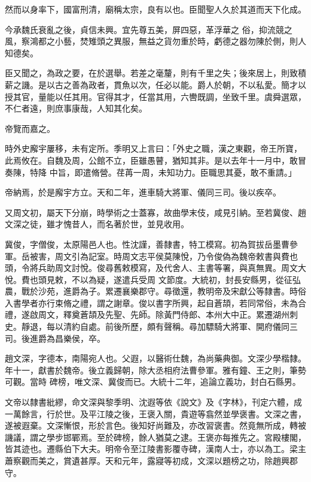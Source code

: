 \begin{pinyinscope}
 然而以身率下，國富刑清，廟稱太宗，良有以也。臣聞聖人久於其道而天下化成。



 今承魏氏衰亂之後，貞信未興。宜先尊五美，屏四惡，革浮華之
 俗，抑流競之風，察鴻都之小藝，焚雉頭之異服，無益之貨勿重於時，虧德之器勿陳於側，則人知德矣。



 臣又聞之，為政之要，在於選舉。若差之毫釐，則有千里之失；後來居上，則致積薪之譏。是以古之善為政者，貫魚以次，任必以能。爵人於朝，不以私愛。簡才以授其官，量能以任其用。官得其才，任當其用，六轡既調，坐致千里。虞舜選眾，不仁者遠，則庶事康哉，人知其化矣。



 帝覽而嘉之。



 時外史廨宇屢移，未有定所。季明又上言曰：「外史之職，漢之東觀，帝王所寶，此焉攸在。自魏及周，公館不立，臣雖愚瞽，猶知其非。是以去年十一月中，敢冒奏陳，特降
 中旨，即遣脩營。荏苒一周，未知功力。臣職思其憂，敢不重請。」



 帝納焉，於是廨宇方立。天和二年，進車騎大將軍、儀同三司。後以疾卒。



 又周文初，屬天下分崩，時學術之士蓋寡，故曲學末伎，咸見引納。至若冀俊、趙文深之徒，雖才愧昔人，而名著於世，並見收用。



 冀俊，字僧俊，太原陽邑人也。性沈謹，善隸書，特工模寫。初為賀拔岳墨曹參軍。岳被害，周文引為記室。時周文志平侯莫陳悅，乃令俊偽為魏帝敕書與費也頭，令將兵助周文討悅。俊尋舊敕模寫，及代舍人、主書等署，與真無異。周文大悅。費也頭見敕，不以為疑，遂遣兵受周
 文節度。大統初，封長安縣男，從征弘農，戰於沙苑，進爵為子。累遷襄樂郡守。尋徵還，教明帝及宋獻公等隸書。時俗入書學者亦行束脩之禮，謂之謝章。俊以書字所興，起自蒼頡，若同常俗，未為合禮，遂啟周文，釋奠蒼頡及先聖、先師。除黃門侍郎、本州大中正。累遷湖州刺史。靜退，每以清約自處。前後所歷，頗有聲稱。尋加驃騎大將軍、開府儀同三司。後進爵為昌樂侯，卒。



 趙文深，字德本，南陽宛人也。父遐，以醫術仕魏，為尚藥典御。文深少學楷隸。年十一，獻書於魏帝。後立義歸朝，除大丞相府法曹參軍。雅有鐘、王之則，筆勢可觀。當時
 碑榜，唯文深、冀俊而已。大統十二年，追論立義功，封白石縣男。



 文帝以隸書紕繆，命文深與黎季明、沈遐等依《說文》及《字林》，刊定六體，成一萬餘言，行於世。及平江陵之後，王褒入關，貴遊等翕然並學褒書。文深之書，遂被遐棄。文深慚恨，形於言色。後知好尚難及，亦改習褒書。然竟無所成，轉被譏議，謂之學步邯鄲焉。至於碑榜，餘人猶莫之逮。王褒亦每推先之。宮殿樓閣，皆其迹也。遷縣伯下大夫。明帝令至江陵書影覆寺碑，漢南人士，亦以為工。梁主蕭察觀而美之，賞遺甚厚。天和元年，露寢等初成，文深以題榜之功，除趙興郡守。




\end{pinyinscope}
